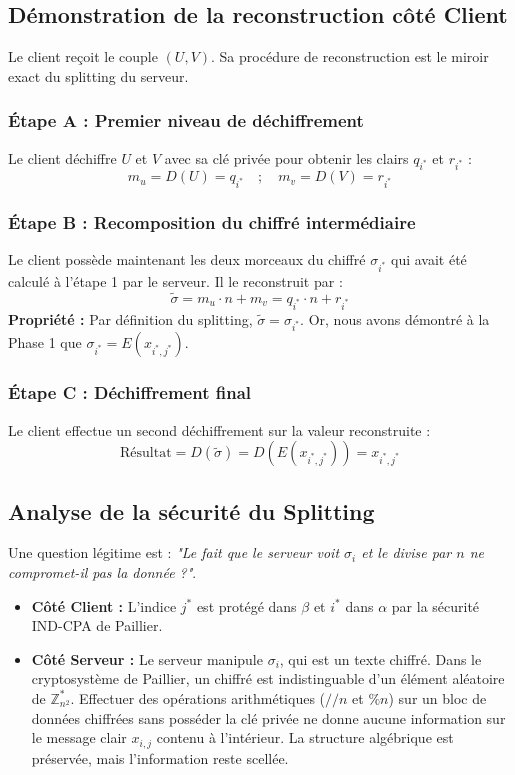 \documentclass[12pt,a4paper]{report}
\begin{document}
\subsection{Démonstration de la reconstruction côté Client}

Le client reçoit le couple $(U, V)$. Sa procédure de reconstruction est le miroir exact du splitting du serveur.

\subsubsection{Étape A : Premier niveau de déchiffrement}
Le client déchiffre $U$ et $V$ avec sa clé privée pour obtenir les clairs $q_{i^*}$ et $r_{i^*}$ :
\[ m_u = D(U) = q_{i^*} \quad ; \quad m_v = D(V) = r_{i^*} \]

\subsubsection{Étape B : Recomposition du chiffré intermédiaire}
Le client possède maintenant les deux morceaux du chiffré $\sigma_{i^*}$ qui avait été calculé à l'étape 1 par le serveur. Il le reconstruit par :
\[ \tilde{\sigma} = m_u \cdot n + m_v = q_{i^*} \cdot n + r_{i^*} \]
\textbf{Propriété :} Par définition du splitting, $\tilde{\sigma} = \sigma_{i^*}$. Or, nous avons démontré à la Phase 1 que $\sigma_{i^*} = E(x_{i^*, j^*})$.

\subsubsection{Étape C : Déchiffrement final}
Le client effectue un second déchiffrement sur la valeur reconstruite :
\[ \text{Résultat} = D(\tilde{\sigma}) = D(E(x_{i^*, j^*})) = x_{i^*, j^*} \]

\subsection{Analyse de la sécurité du Splitting}
Une question légitime est : \textit{"Le fait que le serveur voit $\sigma_i$ et le divise par $n$ ne compromet-il pas la donnée ?"}.
\begin{itemize}
    \item \textbf{Côté Client :} L'indice $j^*$ est protégé dans $\beta$ et $i^*$ dans $\alpha$ par la sécurité IND-CPA de Paillier.
    \item \textbf{Côté Serveur :} Le serveur manipule $\sigma_i$, qui est un texte chiffré. Dans le cryptosystème de Paillier, un chiffré est indistinguable d'un élément aléatoire de $\mathbb{Z}_{n^2}^*$. Effectuer des opérations arithmétiques ($// n$ et $\% n$) sur un bloc de données chiffrées sans posséder la clé privée ne donne aucune information sur le message clair $x_{i,j}$ contenu à l'intérieur. La structure algébrique est préservée, mais l'information reste scellée.
\end{itemize}
\end{document}
